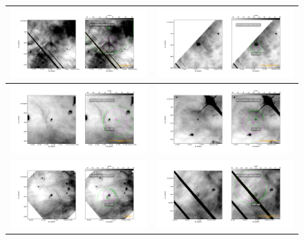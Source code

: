 \begin{figure}[htp]
\centering
\begin{tabular}{|l|l|}
\hline
    \includegraphics[width=0.47\linewidth,  trim=60 50 100 50, clip]{j8oc01010_wcs/170-249-Bally_01-images.pdf}
   &\includegraphics[width=0.47\linewidth,  trim=60 50 100 50, clip]{j8oc01010_wcs/173-236-Bally_01-images.pdf}\\ \hline
   \includegraphics[width=0.47\linewidth,  trim=60 50 100 50, clip]{j8oc01010_wcs/173-342-Bally_01-images.pdf}
   &\includegraphics[width=0.47\linewidth,  trim=60 50 100 50, clip]{j8oc01010_wcs/175-321-Bally_01-images.pdf}\\ \hline
   \includegraphics[width=0.47\linewidth,  trim=60 50 100 50, clip]{j8oc01010_wcs/177-341-Bally_01-images.pdf}
   &\includegraphics[width=0.47\linewidth,  trim=60 50 100 50, clip]{j8oc01010_wcs/178-258-Bally_01-images.pdf}\\ \hline

\end{tabular}
\end{figure}
